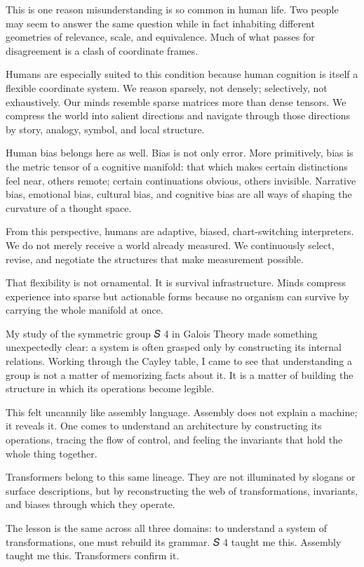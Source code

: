\documentclass[
]{article}
\begin{document}
This is one reason misunderstanding is so common in human life. Two
people may seem to answer the same question while in fact inhabiting
different geometries of relevance, scale, and equivalence. Much of what
passes for disagreement is a clash of coordinate frames.

Humans are especially suited to this condition because human cognition
is itself a flexible coordinate system. We reason sparsely, not densely;
selectively, not exhaustively. Our minds resemble sparse matrices more
than dense tensors. We compress the world into salient directions and
navigate through those directions by story, analogy, symbol, and local
structure.

Human bias belongs here as well. Bias is not only error. More
primitively, bias is the metric tensor of a cognitive manifold: that
which makes certain distinctions feel near, others remote; certain
continuations obvious, others invisible. Narrative bias, emotional bias,
cultural bias, and cognitive bias are all ways of shaping the curvature
of a thought space.

From this perspective, humans are adaptive, biased, chart-switching
interpreters. We do not merely receive a world already measured. We
continuously select, revise, and negotiate the structures that make
measurement possible.

That flexibility is not ornamental. It is survival infrastructure. Minds
compress experience into sparse but actionable forms because no organism
can survive by carrying the whole manifold at once.

My study of the symmetric group 𝑆 4 in Galois Theory made something
unexpectedly clear: a system is often grasped only by constructing its
internal relations. Working through the Cayley table, I came to see that
understanding a group is not a matter of memorizing facts about it. It
is a matter of building the structure in which its operations become
legible.

This felt uncannily like assembly language. Assembly does not explain a
machine; it reveals it. One comes to understand an architecture by
constructing its operations, tracing the flow of control, and feeling
the invariants that hold the whole thing together.

Transformers belong to this same lineage. They are not illuminated by
slogans or surface descriptions, but by reconstructing the web of
transformations, invariants, and biases through which they operate.

The lesson is the same across all three domains: to understand a system
of transformations, one must rebuild its grammar. 𝑆 4 taught me this.
Assembly taught me this. Transformers confirm it.
\end{document}
